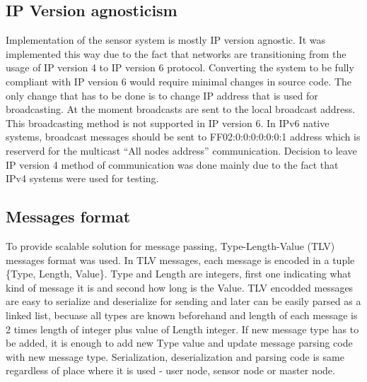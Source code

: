 \subsection{IP Version agnosticism}
\label{subsec:ipveragn}
Implementation of the sensor system is mostly IP version agnostic. It was implemented this way due to the fact that networks are transitioning from the usage of IP version 4 to IP version 6 protocol. Converting the system to be fully compliant with IP version 6 would require minimal changes in source code. The only change that has to be done is to change IP address that is used for broadcasting. At the moment broadcasts are sent to the local broadcast address. This broadcasting method is not supported in IP version 6. In IPv6 native systems, broadcast messages should be sent to FF02:0:0:0:0:0:0:1 address which is reserverd for the multicast ``All nodes address'' communication. Decision to leave IP version 4 method of communication was done mainly due to the fact that IPv4 systems were used for testing.

\subsection{Messages format}
\label{subsec:msgformat}
To provide scalable solution for message passing, Type-Length-Value (TLV) messages format was used. In TLV messages, each message is encoded in a tuple \{Type, Length, Value\}. Type and Length are integers, first one indicating what kind of message it is and second how long is the Value. TLV encodded messages are easy to serialize and deserialize for sending and later can be easily parsed as a linked list, becuase all types are known beforehand and length of each message is 2 times length of integer plus value of Length integer. If new message type has to be added, it is enough to add new Type value and update message parsing code with new message type. Serialization, deserialization and parsing code is same regardless of place where it is used - user node, sensor node or master node.  

